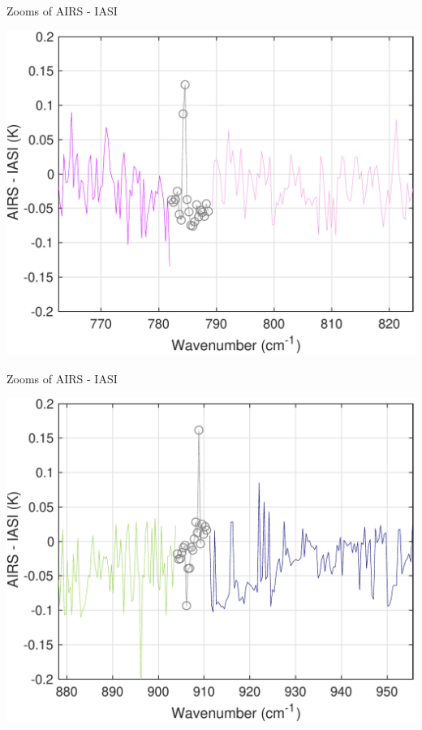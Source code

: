 \documentclass[10pt,t]{beamer}
\begin{document}
\begin{frame}[label={sec:orgf5fd184}]{Zooms of AIRS - IASI}
\begin{center}
\includegraphics[width=0.8\linewidth]{./Figs/Pdf/sno_airs_m_iasi_with_fill_lwzoom2.pdf}
\end{center}
\end{frame}
\begin{frame}[label={sec:orgc41a381}]{Zooms of AIRS - IASI}
\begin{center}
\includegraphics[width=0.8\linewidth]{./Figs/Pdf/sno_airs_m_iasi_with_fill_lwzoom3.pdf}
\end{center}
\end{frame}
\end{document}

